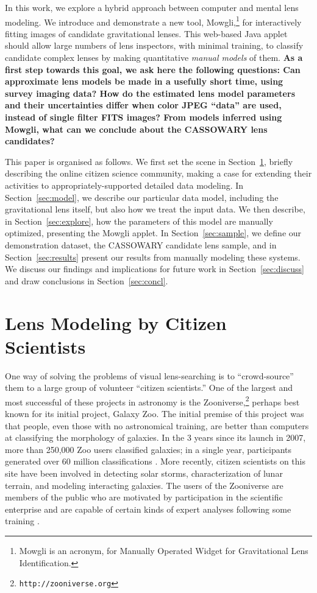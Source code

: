 \documentclass[iop]{emulateapj}
\def\theapplet{{\sc Mowgli}\xspace}
\def\NEW#1{{\bf{#1}}}
\begin{document}
In this work, we explore a hybrid approach between computer and mental lens
modeling. We introduce and demonstrate a new  tool,
\theapplet,\footnote[1]{\theapplet is an acronym, for Manually Operated Widget
for Gravitational Lens Identification.}  for interactively fitting images of
candidate gravitational lenses. This web-based Java applet should allow large
numbers of lens inspectors, with minimal training, to classify candidate
complex  lenses by making quantitative {\it manual models} of them. \NEW{As a
first step towards this goal, we ask here the following questions: Can
approximate lens models be made in a usefully short time, using survey imaging
data? How do the estimated lens model parameters and their uncertainties
differ when color JPEG ``data'' are used, instead of single filter FITS images?
From models inferred using \theapplet, what can we conclude about the
CASSOWARY lens candidates?}

This paper is organised as follows. We first set the scene in
Section~\ref{sec:citsci}, briefly describing the   online citizen science
community, making a case for extending  their activities to
appropriately-supported detailed data modeling. In Section~\ref{sec:model}, we
describe our particular data model, including the gravitational lens itself, but
also how we treat the input data. We then describe, in
Section~\ref{sec:explore},  how the parameters of this model are manually 
optimized, presenting the  \theapplet applet.  In Section~\ref{sec:sample}, we
define our demonstration dataset, the CASSOWARY candidate lens sample, and in 
Section~\ref{sec:results} present our results from manually modeling these
systems. We discuss our findings and implications for future work in 
Section~\ref{sec:discuss} and draw conclusions in  Section~\ref{sec:concl}.



\section{Lens Modeling by Citizen Scientists}
\label{sec:citsci}

One way of solving the problems of visual lens-searching is to
``crowd-source'' them to a large group of volunteer ``citizen scientists.''
One of the largest and most successful of these projects in astronomy is the
Zooniverse,\footnote{\texttt{http://zooniverse.org}} perhaps best known for
its initial project, Galaxy Zoo. The initial premise of this project was that
people, even those with no astronomical training, are better than computers at
classifying the morphology of galaxies. In the 3 years  since its launch in
2007, more than 250,000 Zoo users classified galaxies; in a single year,
participants generated over 60 million classifications \citep{gz1}. More
recently, citizen scientists on this site have been involved in detecting
solar storms, characterization of lunar terrain, and modeling interacting
galaxies. The users of the Zooniverse are members of the public who are
motivated by participation in the scientific enterprise and are capable of
certain kinds of expert analyses following some training \citep{Rad++2010}.
\end{document}
